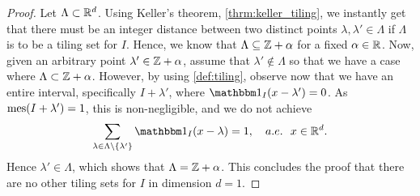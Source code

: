 \documentclass[../thesis.tex]{subfiles}
\begin{document}
\begin{proof}  %
    Let $\Lambda \subset \mathbb{R}^d$. Using Keller's theorem, \cref{thrm:keller_tiling}, we instantly get that there must be an integer distance between two distinct points $\lambda,\lambda' \in \Lambda$ if $\Lambda$ is to be a tiling set for $I$. Hence, we know that $\Lambda \subseteq \mathbb{Z} +\alpha$ for a fixed $\alpha\in \mathbb{R}$. Now, given an arbitrary point $\lambda' \in \mathbb{Z} +\alpha$, assume that $\lambda'\notin \Lambda$ so that we have a case where $\Lambda \subset \mathbb{Z}+\alpha$. However, by using \cref{def:tiling}, observe now that we have an entire interval, specifically $I+\lambda'$, where $\indicator{I}{x - \lambda'} = 0$. As $\operatorname{mes}(I+\lambda') = 1 $, this is non-negligible, and we do not achieve
    \begin{equation*}
        \sum_{\lambda \in \Lambda\setminus \braq{\lambda'}} \indicator{I}{x-\lambda} = 1, \quad a.e. \text{\space\space} x \in \R^d.
    \end{equation*}
    Hence $\lambda' \in \Lambda$, which shows that $\Lambda = \mathbb{Z}+\alpha$. This concludes the proof that there are no other tiling sets for $I$ in dimension $d=1$. %
\end{proof}
\end{document}
